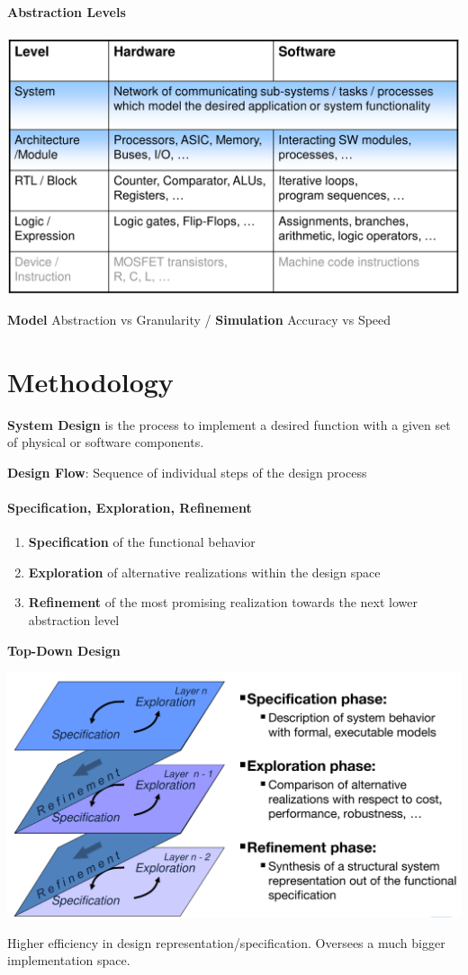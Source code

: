 \documentclass[english]{latex4ei/latex4ei_sheet}
\begin{document}
\paragraph{Abstraction Levels}

\begin{center}
  \includegraphics[width=0.8\linewidth]{assets/AbstractionLevels.png}
\end{center}

\textbf{Model} Abstraction vs Granularity / \textbf{Simulation} Accuracy vs Speed


\section{Methodology}

\textbf{System Design} is the process to implement a desired function with a given set of physical or software components.

\textbf{Design Flow}: Sequence of individual steps of the design process

\paragraph{Specification, Exploration, Refinement}
\begin{enumerate}
		\item \textbf{Specification} of the functional behavior
		\item \textbf{Exploration} of alternative realizations within the design space
		\item \textbf{Refinement} of the most promising realization towards the next lower abstraction level
\end{enumerate}


\textbf{Top-Down Design}
\begin{center}
  \includegraphics[width=0.8\linewidth]{assets/SpecExRef.png}
\end{center}
Higher efficiency in design representation/specification. Oversees a much bigger implementation space.
\end{document}
